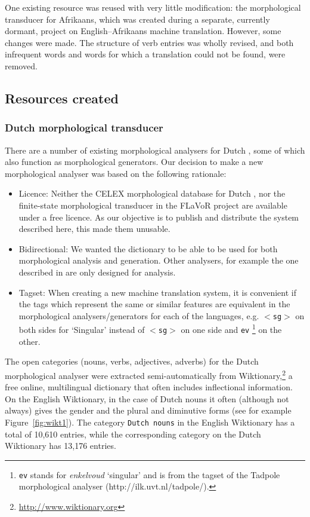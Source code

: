 \documentclass[11pt]{article}
\begin{document}
One existing resource was reused with very little modification: the 
morphological transducer for Afrikaans, which was created during a separate, currently dormant, 
project on English--Afrikaans machine translation. However, some changes were made. The structure 
of verb entries was wholly revised, and both infrequent words and words for which a translation
could not be found, were removed.

\subsection{Resources created}

\subsubsection{Dutch morphological transducer}

There are a number of existing morphological analysers for Dutch \cite{Bosch:07,Laureys:04,DePauw:04},
some of which also function as morphological generators. Our decision to make a new morphological 
analyser was based on the following rationale:

\begin{itemize}
\item Licence: Neither the CELEX morphological database for Dutch \cite{Laureys:04},
    nor the finite-state morphological transducer in the FLaVoR project \cite{DePauw:04}
    are available under a free licence. As our objective is to publish and distribute 
    the system described here, this made them unusable.
\item Bidirectional: We wanted the dictionary to be able to be used for both
    morphological analysis and generation. Other analysers, for example the 
    one described in  are only designed for analysis.
\item Tagset: When creating a new machine translation system, it is convenient
    if the tags which represent the same or similar features are equivalent in the 
    morphological analysers/generators for each of the languages,
    e.g. {\small {\tt $<$sg$>$}} on both sides for `Singular' instead 
    of {\small {\tt $<$sg$>$}} on one side and {\small {\tt ev}} 
    \footnote{{\tt ev} stands for \emph{enkelvoud} `singular' and is from the tagset of the Tadpole morphological analyser (http://ilk.uvt.nl/tadpole/).} on the other.
\end{itemize}

The open categories (nouns, verbs, adjectives, adverbs) for the Dutch 
morphological analyser were extracted semi-automatically from 
Wiktionary,\footnote{\url{http://www.wiktionary.org}} a free online, multilingual
dictionary that often includes inflectional information. On the English Wiktionary, in the case 
of Dutch nouns it often (although not always) gives the gender and the 
plural and diminutive forms (see for example Figure~\ref{fig:wikt1}).
The category {\small {\tt Dutch nouns}} in the English Wiktionary has a total of 10,610 entries,
while the corresponding category on the Dutch Wiktionary has 13,176 entries.
\end{document}
